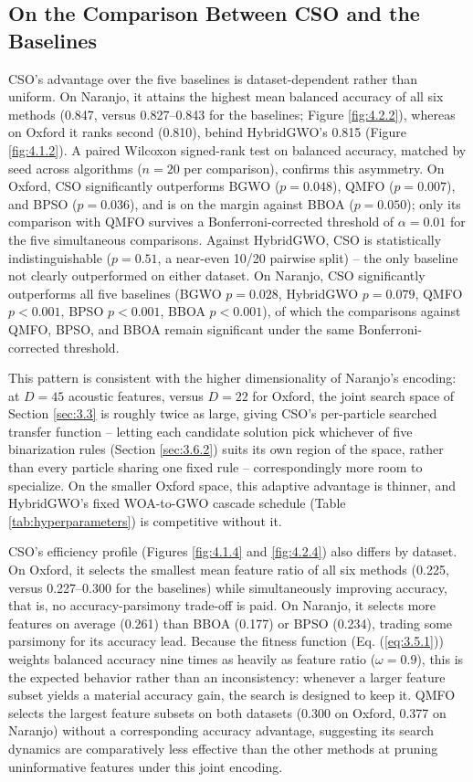 \subsection{On the Comparison Between CSO and the Baselines} \label{sec:5.2}
CSO's advantage over the five baselines is dataset-dependent rather than uniform. On Naranjo, it attains the highest mean balanced accuracy of all six methods (0.847, versus 0.827--0.843 for the baselines; Figure \ref{fig:4.2.2}), whereas on Oxford it ranks second (0.810), behind HybridGWO's 0.815 (Figure \ref{fig:4.1.2}). A paired Wilcoxon signed-rank test on balanced accuracy, matched by seed across algorithms ($n=20$ per comparison), confirms this asymmetry. On Oxford, CSO significantly outperforms BGWO ($p=0.048$), QMFO ($p=0.007$), and BPSO ($p=0.036$), and is on the margin against BBOA ($p=0.050$); only its comparison with QMFO survives a Bonferroni-corrected threshold of $\alpha=0.01$ for the five simultaneous comparisons. Against HybridGWO, CSO is statistically indistinguishable ($p=0.51$, a near-even 10/20 pairwise split) -- the only baseline not clearly outperformed on either dataset. On Naranjo, CSO significantly outperforms all five baselines (BGWO $p=0.028$, HybridGWO $p=0.079$, QMFO $p<0.001$, BPSO $p<0.001$, BBOA $p<0.001$), of which the comparisons against QMFO, BPSO, and BBOA remain significant under the same Bonferroni-corrected threshold.

This pattern is consistent with the higher dimensionality of Naranjo's encoding: at $D=45$ acoustic features, versus $D=22$ for Oxford, the joint search space of Section \ref{sec:3.3} is roughly twice as large, giving CSO's per-particle searched transfer function -- letting each candidate solution pick whichever of five binarization rules (Section \ref{sec:3.6.2}) suits its own region of the space, rather than every particle sharing one fixed rule -- correspondingly more room to specialize. On the smaller Oxford space, this adaptive advantage is thinner, and HybridGWO's fixed WOA-to-GWO cascade schedule (Table \ref{tab:hyperparameters}) is competitive without it.

CSO's efficiency profile (Figures \ref{fig:4.1.4} and \ref{fig:4.2.4}) also differs by dataset. On Oxford, it selects the smallest mean feature ratio of all six methods (0.225, versus 0.227--0.300 for the baselines) while simultaneously improving accuracy, that is, no accuracy-parsimony trade-off is paid. On Naranjo, it selects more features on average (0.261) than BBOA (0.177) or BPSO (0.234), trading some parsimony for its accuracy lead. Because the fitness function (Eq. (\ref{eq:3.5.1})) weights balanced accuracy nine times as heavily as feature ratio ($\omega=0.9$), this is the expected behavior rather than an inconsistency: whenever a larger feature subset yields a material accuracy gain, the search is designed to keep it. QMFO selects the largest feature subsets on both datasets (0.300 on Oxford, 0.377 on Naranjo) without a corresponding accuracy advantage, suggesting its search dynamics are comparatively less effective than the other methods at pruning uninformative features under this joint encoding.

